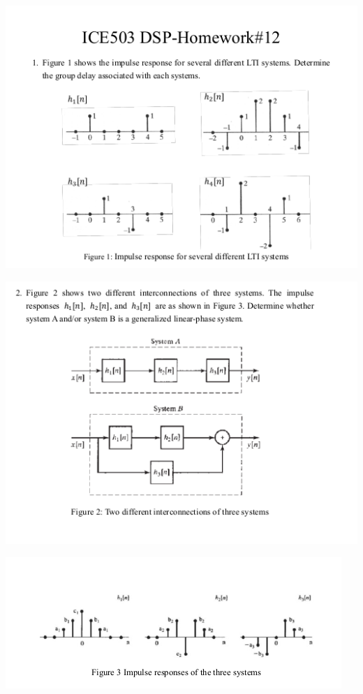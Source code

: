 \documentclass[a4paper]{article}
\begin{document}
	\begin{center}
		\includegraphics[width=1.25\linewidth]{screenshot004}
	\end{center}
	\newpage
	
	\begin{center}
		\includegraphics[width=1.25\linewidth]{screenshot005}
	\end{center}
	\begin{center}
		\includegraphics[width=1.25\linewidth]{screenshot006}
	\end{center}
	\newpage
	
\end{document}
